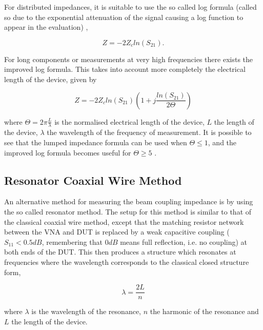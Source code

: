 For distributed impedances, it is suitable to use the so called log formula (called so due to the exponential attenuation of the signal causing a log function to appear in the evaluation) \cite{Hahn:BenchMeasInter, Hahn: ValidityImpMeas, Jensen:ImprovLogForm},

\begin{equation}
Z = -2Z_{c} ln \left( S_{21} \right).
\end{equation}

For long components or measurements at very high frequencies there exists the improved log formula. This takes into account more completely the electrical length of the device, given by

\begin{equation}
Z = -2Z_{c} ln \left( S_{21}  \right) \left( 1 + j\frac{ln \left( S_{21}\right) }{2\Theta}  \right)
\end{equation}

where $\Theta = 2\pi \frac{L}{\lambda}$ is the normalised electrical length of the device, $L$ the length of the device, $\lambda$ the wavelength of the frequency of measurement. It is possible to see that the lumped impedance formula can be used when $\Theta \leq 1$, and the improved log formula becomes useful for $\Theta \geq 5$ \cite{Jensen:ImprovLogForm}.




\subsection{Resonator Coaxial Wire Method}
\label{sec:reson-coax-meth}

An alternative method for measuring the beam coupling impedance is by using the so called resonator method. The setup for this method is similar to that of the classical coaxial wire method, except that the matching resistor network between the VNA and DUT is replaced by a weak capacitive coupling ($S_{11} < 0.5dB$, remembering that $0dB$ means full reflection, i.e. no coupling) at both ends of the DUT. This then produces a structure which resonates at frequencies where the wavelength corresponds to the classical closed structure form,

\begin{equation}
\lambda = \frac{2L}{n}
\end{equation}

where $\lambda$ is the wavelength of the resonance, $n$ the harmonic of the resonance and $L$ the length of the device. 

